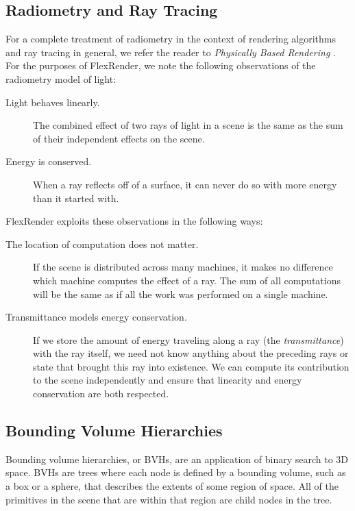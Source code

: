 \documentclass[a4paper,twoside]{article}
\begin{document}
\subsection{Radiometry and Ray Tracing}
\label{radiometryraytracing}

For a complete treatment of radiometry in the context of rendering algorithms
and ray tracing in general, we refer the reader to
\emph{Physically Based Rendering} \cite{pbrt}. For the purposes of FlexRender,
we note the following observations of the radiometry model of light:

\begin{description}
    \item[Light behaves linearly.] The combined effect of two rays of light
        in a scene is the same as the sum of their independent effects on the
        scene.
    \item[Energy is conserved.] When a ray reflects off of a surface, it can
        never do so with more energy than it started with.
\end{description}

FlexRender exploits these observations in the following ways:

\begin{description}
    \item[The location of computation does not matter.] If the scene is
        distributed across many machines, it makes no difference which machine
        computes the effect of a ray. The sum of all computations will be the
        same as if all the work was performed on a single machine.
    \item[Transmittance models energy conservation.] If we store the amount of
        energy traveling along a ray (the \emph{transmittance}) with the ray
        itself, we need not know anything about the preceding rays or state
        that brought this ray into existence. We can compute its contribution
        to the scene independently and ensure that linearity and energy
        conservation are both respected.
\end{description}

\subsection{Bounding Volume Hierarchies}
\label{bvhs}

Bounding volume hierarchies, or BVHs, are an application of binary search to 3D
space. BVHs are trees where each node is defined by a bounding volume, such as
a box or a sphere, that describes the extents of some region of space. All of
the primitives in the scene that are within that region are child nodes in the
tree.
\end{document}

